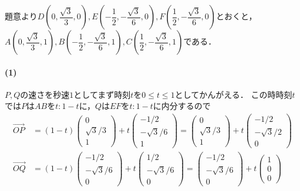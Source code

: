 \documentclass[../../main.tex]{subfiles}
\begin{document}
題意より$D(0, \dfrac{\sqrt{3}}{3},0), E(-\dfrac{1}{2}, -\dfrac{\sqrt{3}}{6},0), F(\dfrac{1}{2}, -\dfrac{\sqrt{3}}{6},0)$とおくと，$A(0, \dfrac{\sqrt{3}}{3},1), B(-\dfrac{1}{2}, -\dfrac{\sqrt{3}}{6},1), C(\dfrac{1}{2}, -\dfrac{\sqrt{3}}{6},1)$である．

\paragraph{(1)}

$P, Q$の速さを秒速$1$としてまず時刻$t$を$0 \le t \le 1$としてかんがえる．
この時時刻$t$では$P$は$AB$を$t : 1-t$に，$Q$は$EF$を$t : 1-t$に内分するので
\begin{align}
  \overrightarrow{OP} &= (1-t)
  \begin{pmatrix} 0 \\ \sqrt{3}/3 \\ 1
  \end{pmatrix} + t
  \begin{pmatrix} -1/2 \\ -\sqrt{3}/6 \\ 1
  \end{pmatrix} =
  \begin{pmatrix} 0 \\ \sqrt{3}/3 \\ 1
  \end{pmatrix} + t
  \begin{pmatrix} -1/2 \\ -\sqrt{3}/2 \\ 0
  \end{pmatrix} \\
  \overrightarrow{OQ} &= (1-t)
  \begin{pmatrix} -1/2 \\ -\sqrt{3}/6 \\ 0
  \end{pmatrix} + t
  \begin{pmatrix} 1/2 \\ -\sqrt{3}/6 \\ 0
  \end{pmatrix} =
  \begin{pmatrix} -1/2 \\ -\sqrt{3}/6 \\ 0
  \end{pmatrix} + t
  \begin{pmatrix} 1 \\ 0 \\ 0
  \end{pmatrix}
\end{align}
\end{document}
